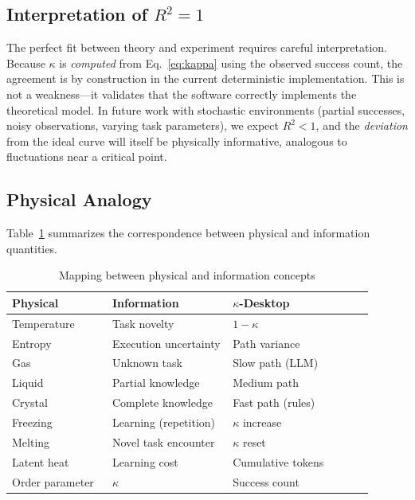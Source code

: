 \documentclass[10pt,twocolumn]{article}
\newcommand{\kap}{\kappa}
\newcommand{\kdes}{$\kappa$-Desktop}
\begin{document}
\subsection{Interpretation of $R^2 = 1$}

The perfect fit between theory and experiment requires 
careful interpretation. Because $\kap$ is \textit{computed} 
from Eq.~\ref{eq:kappa} using the observed success count, 
the agreement is by construction in the current deterministic 
implementation. This is not a weakness---it validates that 
the software correctly implements the theoretical model. In 
future work with stochastic environments (partial successes, 
noisy observations, varying task parameters), we expect 
$R^2 < 1$, and the \textit{deviation} from the ideal curve 
will itself be physically informative, analogous to 
fluctuations near a critical point.

\subsection{Physical Analogy}

Table~\ref{tab:analogy} summarizes the correspondence 
between physical and information quantities.

\begin{table}[htbp]
\centering
\caption{Mapping between physical and information concepts}
\label{tab:analogy}
\small
\begin{tabular}{p{0.25\linewidth}p{0.30\linewidth}p{0.35\linewidth}}
\toprule
\textbf{Physical} & \textbf{Information} & 
  \textbf{\kdes{}} \\
\midrule
Temperature & Task novelty & $1-\kap$ \\
Entropy & Execution uncertainty & Path variance \\
Gas & Unknown task & Slow path (LLM) \\
Liquid & Partial knowledge & Medium path \\
Crystal & Complete knowledge & Fast path (rules) \\
Freezing & Learning (repetition) & $\kap$ increase \\
Melting & Novel task encounter & $\kap$ reset \\
Latent heat & Learning cost & Cumulative tokens \\
Order parameter & $\kap$ & Success count \\
\bottomrule
\end{tabular}
\end{table}
\end{document}
